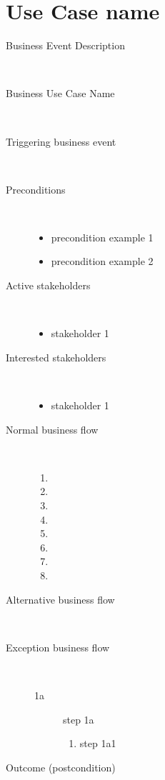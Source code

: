 \section{Use Case name}

\begin{description}
	\item[Business Event Description] \ 
		\par 
	\item[Business Use Case Name] \ 
		\par 
	\item[Triggering business event] \ 
		\par 
	\item[Preconditions] \
	\begin{itemize}
		\item precondition example 1
		\item precondition example 2
	\end{itemize}
	\item[Active stakeholders] \ 
	\begin{itemize}
		\item stakeholder 1
	\end{itemize}
	\item[Interested stakeholders] \ 
		\begin{itemize}
		\item stakeholder 1
		\end{itemize}
	\item[Normal business flow] \ 
	\begin{enumerate}
	  	\item 
	  	\item 
	  	\item 
	  	\item 
	  	\item 
	  	\item 
	  	\item 
	  	\item
	\end{enumerate}
	\item[Alternative business flow] \ 
	\item[Exception business flow] \ 
	\begin{description}
		\item[1a] step 1a
		\begin{enumerate}
		  \item step 1a1
		\end{enumerate}
	\end{description}
	\item[Outcome (postcondition)] \ 
		\par
\end{description}